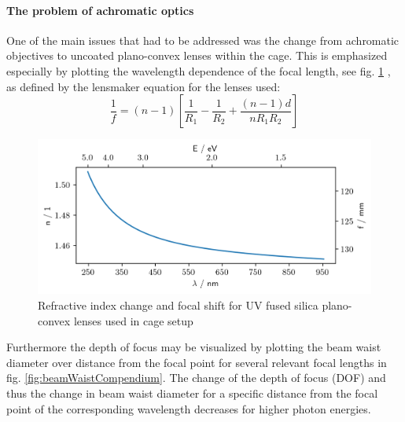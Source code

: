 \documentclass[twoside,openright]{scrreprt}
\begin{document}
\paragraph{The problem of achromatic optics}
One of the main issues that had to be addressed was the change from achromatic objectives to uncoated plano-convex lenses within the cage.\newline
This is emphasized especially by plotting the wavelength dependence of the focal length, see fig. \ref{fig:ChromFocalShift} , as defined by the lensmaker equation for the lenses used:
\begin{equation}
\frac{1}{f} = (n-1) \left[\frac{1}{R_1} - \frac{1}{R_2} + \frac{(n-1)d}{n R_1 R_2}\right]
\end{equation}
\begin{figure}[h]
\centering
\includegraphics[scale = 0.5]{images/ChromaticFocalShiftandDispersionUVFS.png} 
\caption{Refractive index change and focal shift for UV fused silica plano-convex lenses used in cage setup\cite{Malitson:65}\label{fig:ChromFocalShift}}
\end{figure}

Furthermore the depth of focus may be visualized by plotting the beam waist diameter over distance from the focal point for several relevant focal lengths in fig. \ref{fig:beamWaistCompendium}. The change of the depth of focus (DOF) and thus the change in beam waist diameter for a specific distance from the focal point of the corresponding wavelength decreases for higher photon energies.
\end{document}
